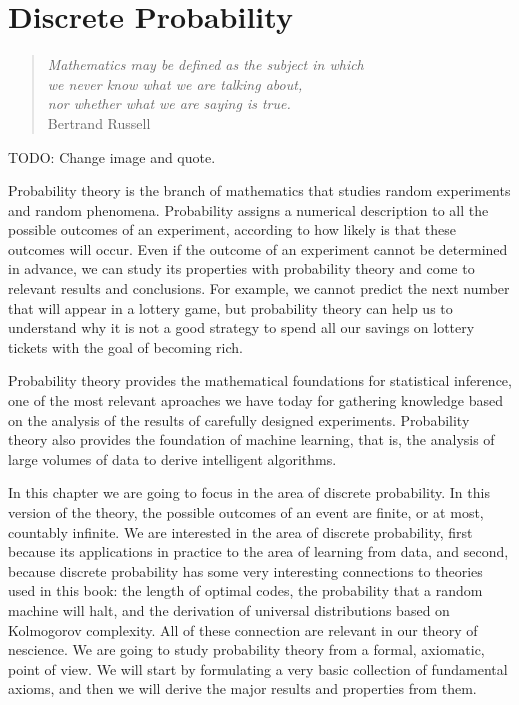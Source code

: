 %
%


\chapter{Discrete Probability}
\label{chap:Probability Theory}

\begin{quote}
\begin{flushright}
\emph{Mathematics may be defined as the subject in which\\
we never know what we are talking about,\\
nor whether what we are saying is true.}\\
Bertrand Russell
\end{flushright}
\end{quote}
\bigskip

{\color{red} TODO: Change image and quote.}

Probability theory is the branch of mathematics that studies random experiments and random phenomena. Probability assigns a numerical description to all the possible outcomes of an experiment, according to how likely is that these outcomes will occur. Even if the outcome of an experiment cannot be determined in advance, we can study its properties with probability theory and come to relevant results and conclusions. For example, we cannot predict the next number that will appear in a lottery game, but probability theory can help us to understand why it is not a good strategy to spend all our savings on lottery tickets with the goal of becoming rich.

Probability theory provides the mathematical foundations for statistical inference, one of the most relevant aproaches we have today for gathering knowledge based on the analysis of the results of carefully designed experiments. Probability theory also provides the foundation of machine learning, that is, the analysis of large volumes of data to derive intelligent algorithms.

In this chapter we are going to focus in the area of discrete probability. In this version of the theory, the possible outcomes of an event are finite, or at most, countably infinite. We are interested in the area of discrete probability, first because its applications in practice to the area of learning from data, and second, because discrete probability has some very interesting connections to theories used in this book: the length of optimal codes, the probability that a random machine will halt, and the derivation of universal distributions based on Kolmogorov complexity. All of these connection are relevant in our theory of nescience. We are going to study probability theory from a formal, axiomatic, point of view. We will start by formulating a very basic collection of fundamental axioms, and then we will derive the major results and properties from them. 

